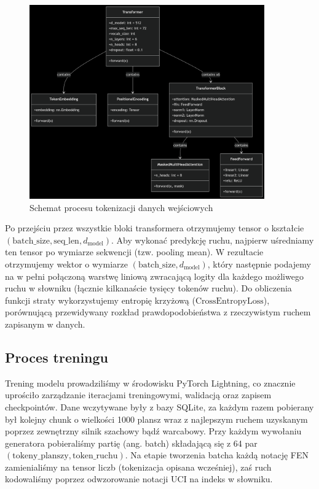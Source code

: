 \documentclass[12pt]{article}
\begin{document}
\begin{figure}[H]
  \centering
  \includegraphics[width=0.9\textwidth]{graf2.png}
  \caption{Schemat procesu tokenizacji danych wejściowych}
\end{figure}

Po przejściu przez wszystkie bloki transformera otrzymujemy tensor o kształcie\\ \((\text{batch\_size}, \text{seq\_len}, d_{\text{model}})\). Aby wykonać predykcję ruchu, najpierw uśredniamy ten tensor po wymiarze sekwencji (tzw. pooling mean). W rezultacie otrzymujemy wektor o wymiarze \((\text{batch\_size}, d_{\text{model}})\), który następnie podajemy na w pełni połączoną warstwę liniową zwracającą logity dla każdego możliwego ruchu w słowniku (łącznie kilkanaście tysięcy tokenów ruchu). Do obliczenia funkcji straty wykorzystujemy entropię krzyżową (\(\text{CrossEntropyLoss}\)), porównującą przewidywany rozkład prawdopodobieństwa z rzeczywistym ruchem zapisanym w danych.

\subsection{Proces treningu}

Trening modelu prowadziliśmy w środowisku PyTorch Lightning, co znacznie uprościło zarządzanie iteracjami treningowymi, walidacją oraz zapisem checkpointów. Dane wczytywane były z bazy SQLite, za każdym razem pobierany był kolejny chunk o wielkości 1000 plansz wraz z najlepszym ruchem uzyskanym poprzez zewnętrzny silnik szachowy bądź warcabowy.  Przy każdym wywołaniu generatora pobieraliśmy partię (ang. batch) składającą się z 64 par \((\text{tokeny\_planszy}, \text{token\_ruchu})\). Na etapie tworzenia batcha każdą notację FEN zamienialiśmy na tensor liczb (tokenizacja opisana wcześniej), zaś ruch kodowaliśmy poprzez odwzorowanie notacji UCI na indeks w słowniku.
\end{document}
